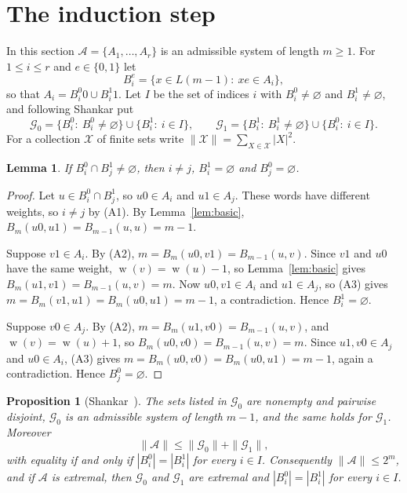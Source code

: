 \documentclass[screen]{aomart}
\newtheorem{proposition}[theorem]{Proposition}
\newtheorem{lemma}[theorem]{Lemma}
\theoremstyle{definition}
\theoremstyle{remark}
\numberwithin{equation}{section}
\newcommand{\cA}{\mathcal{A}}
\newcommand{\cG}{\mathcal{G}}
\DeclareMathOperator{\wt}{w}
\begin{document}
\section{The induction step}\label{sec:induction}

In this section $\cA=\{A_1,\dots,A_r\}$ is an admissible system of length $m\ge1$. For $1\le i\le r$ and $e\in\{0,1\}$ let
\[
B_i^e=\{x\in L(m-1):\ xe\in A_i\},
\]
so that $A_i=B_i^0 0\cup B_i^1 1$. Let $I$ be the set of indices $i$ with $B_i^0\ne\varnothing$ and $B_i^1\ne\varnothing$, and following Shankar put
\[
\cG_0=\{B_i^0:\ B_i^0\ne\varnothing\}\cup\{B_i^1:\ i\in I\},\qquad
\cG_1=\{B_i^1:\ B_i^1\ne\varnothing\}\cup\{B_i^0:\ i\in I\}.
\]
For a collection $\mathcal X$ of finite sets write $\|\mathcal X\|=\sum_{X\in\mathcal X}|X|^2$.

\begin{lemma}\label{lem:disjoint}
If $B_i^0\cap B_j^1\ne\varnothing$, then $i\ne j$, $B_i^1=\varnothing$ and $B_j^0=\varnothing$.
\end{lemma}

\begin{proof}
Let $u\in B_i^0\cap B_j^1$, so $u0\in A_i$ and $u1\in A_j$. These words have different weights, so $i\ne j$ by (A1). By Lemma~\ref{lem:basic}, $B_m(u0,u1)=B_{m-1}(u,u)=m-1$.

Suppose $v1\in A_i$. By (A2), $m=B_m(u0,v1)=B_{m-1}(u,v)$. Since $v1$ and $u0$ have the same weight, $\wt(v)=\wt(u)-1$, so Lemma~\ref{lem:basic} gives $B_m(u1,v1)=B_{m-1}(u,v)=m$. Now $u0,v1\in A_i$ and $u1\in A_j$, so (A3) gives $m=B_m(v1,u1)=B_m(u0,u1)=m-1$, a contradiction. Hence $B_i^1=\varnothing$.

Suppose $v0\in A_j$. By (A2), $m=B_m(u1,v0)=B_{m-1}(u,v)$, and $\wt(v)=\wt(u)+1$, so $B_m(u0,v0)=B_{m-1}(u,v)=m$. Since $u1,v0\in A_j$ and $u0\in A_i$, (A3) gives $m=B_m(u0,v0)=B_m(u0,u1)=m-1$, again a contradiction. Hence $B_j^0=\varnothing$.
\end{proof}

\begin{proposition}[{Shankar~\cite[Lemma~2.3]{Sh}}]\label{prop:inequality}
The sets listed in $\cG_0$ are nonempty and pairwise disjoint, $\cG_0$ is an admissible system of length $m-1$, and the same holds for $\cG_1$. Moreover
\[
\|\cA\|\le\|\cG_0\|+\|\cG_1\| ,
\]
with equality if and only if $|B_i^0|=|B_i^1|$ for every $i\in I$. Consequently $\|\cA\|\le 2^m$, and if $\cA$ is extremal, then $\cG_0$ and $\cG_1$ are extremal and $|B_i^0|=|B_i^1|$ for every $i\in I$.
\end{proposition}
\end{document}
